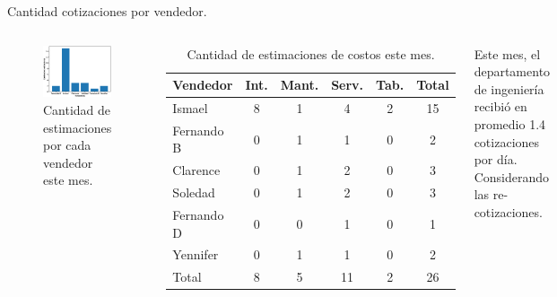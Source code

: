 \documentclass[aspectratio=169,xcolor=dvipsnames]{beamer}
\begin{document}
\begin{frame}{Cantidad cotizaciones por vendedor.}
\begin{columns}[c]
 \begin{figure}
     \includegraphics[width=\textwidth]{EPS/vendedor_cantidad.eps}
     \caption{Cantidad de estimaciones por cada vendedor este mes.}
     \label{graph_cantidad_estimaciones_mes}
    \end{figure}
\begin{table}[h!]
\begin{tabular}{|l|c|c|c|c|c|}\hline
  \rowcolor{MediumBlue} \color{white}Vendedor & \color{white} Int. & \color{white} Mant.& \color{white} Serv. & \color{white} Tab. & \color{white}  Total\\\hline
Ismael & 8 & 1 & 4 & 2 & 15 \\
Fernando B & 0 & 1 & 1 & 0 & 2 \\
Clarence & 0 & 1 & 2 & 0 & 3 \\
Soledad & 0 & 1 & 2 & 0 & 3 \\
Fernando D & 0 & 0 & 1 & 0 & 1 \\
Yennifer & 0 & 1 & 1 & 0 & 2\\\hline
Total & 8 & 5 & 11 & 2 & 26\\\hline
\end{tabular}
\caption{Cantidad de estimaciones de costos este mes.}
\label{cantidad_estimaciones_mes}
\end{table}
\begin{block}{}
    \scriptsize{Este mes, el departamento de ingeniería recibió en promedio 1.4 cotizaciones por día. Considerando las re-cotizaciones.}
\end{block}
 \end{columns}


 
\end{frame}
\end{document}
